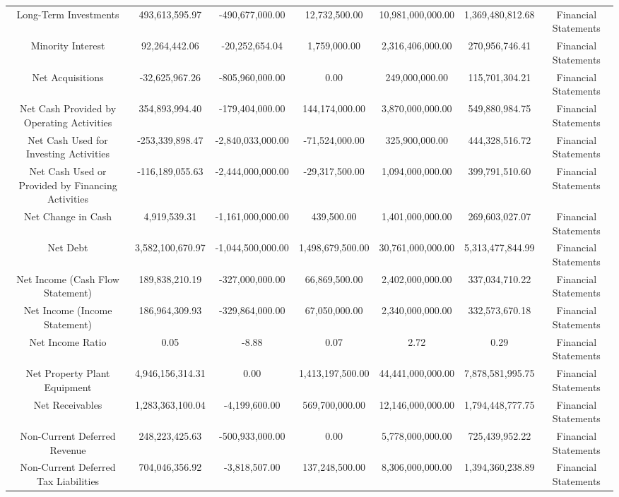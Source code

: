\begin{longtable}{ccccccc}
Long-Term Investments & 493,613,595.97 & -490,677,000.00 & 12,732,500.00 & 10,981,000,000.00 & 1,369,480,812.68 & Financial Statements \\
Minority Interest & 92,264,442.06 & -20,252,654.04 & 1,759,000.00 & 2,316,406,000.00 & 270,956,746.41 & Financial Statements \\
Net Acquisitions & -32,625,967.26 & -805,960,000.00 & 0.00 & 249,000,000.00 & 115,701,304.21 & Financial Statements \\
Net Cash Provided by Operating Activities & 354,893,994.40 & -179,404,000.00 & 144,174,000.00 & 3,870,000,000.00 & 549,880,984.75 & Financial Statements \\
Net Cash Used for Investing Activities & -253,339,898.47 & -2,840,033,000.00 & -71,524,000.00 & 325,900,000.00 & 444,328,516.72 & Financial Statements \\
Net Cash Used or Provided by Financing Activities & -116,189,055.63 & -2,444,000,000.00 & -29,317,500.00 & 1,094,000,000.00 & 399,791,510.60 & Financial Statements \\
Net Change in Cash & 4,919,539.31 & -1,161,000,000.00 & 439,500.00 & 1,401,000,000.00 & 269,603,027.07 & Financial Statements \\
Net Debt & 3,582,100,670.97 & -1,044,500,000.00 & 1,498,679,500.00 & 30,761,000,000.00 & 5,313,477,844.99 & Financial Statements \\
Net Income (Cash Flow Statement) & 189,838,210.19 & -327,000,000.00 & 66,869,500.00 & 2,402,000,000.00 & 337,034,710.22 & Financial Statements \\
Net Income (Income Statement) & 186,964,309.93 & -329,864,000.00 & 67,050,000.00 & 2,340,000,000.00 & 332,573,670.18 & Financial Statements \\
Net Income Ratio & 0.05 & -8.88 & 0.07 & 2.72 & 0.29 & Financial Statements \\
Net Property Plant Equipment & 4,946,156,314.31 & 0.00 & 1,413,197,500.00 & 44,441,000,000.00 & 7,878,581,995.75 & Financial Statements \\
Net Receivables & 1,283,363,100.04 & -4,199,600.00 & 569,700,000.00 & 12,146,000,000.00 & 1,794,448,777.75 & Financial Statements \\
Non-Current Deferred Revenue & 248,223,425.63 & -500,933,000.00 & 0.00 & 5,778,000,000.00 & 725,439,952.22 & Financial Statements \\
Non-Current Deferred Tax Liabilities & 704,046,356.92 & -3,818,507.00 & 137,248,500.00 & 8,306,000,000.00 & 1,394,360,238.89 & Financial Statements \\

\end{longtable}
